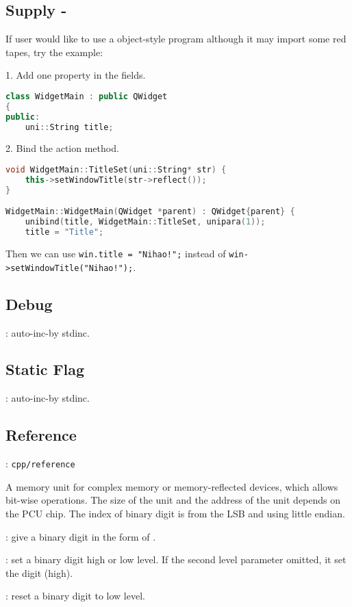 \subsection{Supply \mbox{-} }

If user would like to use a object-style program although it may import some red tapes, try the example:

1. Add one property in the fields.
\begin{lstlisting}[language=C++]
class WidgetMain : public QWidget
{
public:
	uni::String title;
\end{lstlisting}

2. Bind the action method.
\begin{lstlisting}[language=C++]
void WidgetMain::TitleSet(uni::String* str) {
	this->setWindowTitle(str->reflect());
}

WidgetMain::WidgetMain(QWidget *parent) : QWidget{parent} {
	unibind(title, WidgetMain::TitleSet, unipara(1));
	title = "Title";
\end{lstlisting}

Then we can use \verb|win.title = "Nihao!";| instead of \verb|win->setWindowTitle("Nihao!");|.

\subsection{Debug}
: auto-inc-by stdinc.

\subsection{Static Flag}
: auto-inc-by stdinc.

\subsection{Reference}
: \verb`cpp/reference`

A memory unit for complex memory or memory-reflected devices, which allows bit-wise operations.
The size of {the unit} and {the address of the unit} depends on the PCU chip.
The index of binary digit is from the LSB and using little endian.

: give a binary digit in the form of . 

: set a binary digit high or low level. If the second level parameter omitted, it set the digit (high).

: reset a binary digit to low level.

